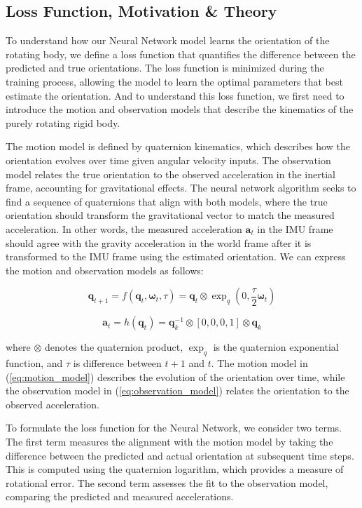 \documentclass[conference]{IEEEtran}
\begin{document}
\subsection{Loss Function, Motivation \& Theory}
To understand how our Neural Network model learns the orientation of the rotating body, we define a loss function that
quantifies the difference between the predicted and true orientations. The loss function is minimized during the
training process, allowing the model to learn the optimal parameters that best estimate the orientation. And to
understand this loss function, we first need to introduce the motion and observation models that describe the kinematics of the purely rotating rigid body.

The motion model is defined by quaternion kinematics, which describes how the orientation evolves over time given
angular velocity inputs. The observation model relates the true orientation to the observed acceleration in the inertial
frame, accounting for gravitational effects. The neural network algorithm seeks to find a sequence of quaternions that align with
both models, where the true orientation should transform the gravitational vector to match the measured acceleration.
In other words, the measured acceleration $\bm{a}_t$ in the IMU frame should agree with the gravity acceleration in the
world frame after it is transformed to the IMU frame using the estimated orientation. We can express the motion and
observation models as follows:

\begin{equation}\label{eq:motion_model}
  \bm{q}_{t+1} = f(\bm{q}_t, \bm{\omega}_t, \tau) = \bm{q}_t \otimes \exp_q\left(0, \frac{\tau}{2} \bm{\omega}_t\right)
\end{equation}

\begin{equation}\label{eq:observation_model}
\bm{a}_t = h(\bm{q}_t) = \bm{q}_k^{-1} \otimes [0, 0, 0, 1] \otimes \bm{q}_k
\end{equation}

where \( \otimes \) denotes the quaternion product, \( \exp_q \) is the quaternion exponential function, and \( \tau \)
is difference between $t+1$ and $t$. The motion model in (\ref{eq:motion_model}) describes the evolution of the
orientation over time, while the observation model in (\ref{eq:observation_model}) relates the orientation to the observed acceleration.

To formulate the loss function for the Neural Network, we consider two terms. The first term measures the alignment with the motion model by taking the difference between the predicted and actual orientation at subsequent time steps. This is computed using the quaternion logarithm, which provides a measure of rotational error. The second term assesses the fit to the observation model, comparing the predicted and measured accelerations.
\end{document}
